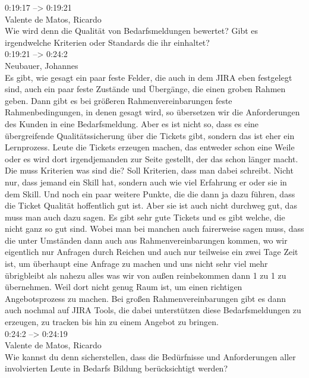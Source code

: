 0:19:17 --> 0:19:21\\
Valente de Matos, Ricardo\\
Wie wird denn die Qualität von Bedarfsmeldungen bewertet? Gibt es irgendwelche Kriterien oder Standards die ihr einhaltet?\\

0:19:21 --> 0:24:2\\
Neubauer, Johannes\\
Es gibt, wie gesagt ein paar feste Felder, die auch in dem JIRA eben festgelegt sind, auch ein paar feste Zustände und Übergänge, die einen groben Rahmen geben. Dann gibt es bei größeren Rahmenvereinbarungen feste Rahmenbedingungen, in denen gesagt wird, so übersetzen wir die Anforderungen des Kunden in eine Bedarfsmeldung. Aber es ist nicht so, dass es eine übergreifende Qualitätssicherung über die Tickets gibt, sondern das ist eher ein Lernprozess. Leute die Tickets erzeugen machen, das entweder schon eine Weile oder es wird dort irgendjemanden zur Seite gestellt, der das schon länger macht. Die muss Kriterien was sind die? Soll Kriterien, dass man dabei schreibt. Nicht nur, dass jemand ein Skill hat, sondern auch wie viel Erfahrung er oder sie in dem Skill. Und noch ein paar weitere Punkte, die die dann ja dazu führen, dass die Ticket Qualität hoffentlich gut ist. Aber sie ist auch nicht durchweg gut, das muss man auch dazu sagen. Es gibt sehr gute Tickets und es gibt welche, die nicht ganz so gut sind. Wobei man bei manchen auch fairerweise sagen muss, dass die unter Umständen dann auch aus Rahmenvereinbarungen kommen, wo wir eigentlich nur Anfragen durch Reichen und auch nur teilweise ein zwei Tage Zeit ist, um überhaupt eine Anfrage zu machen und uns nicht sehr viel mehr übrigbleibt als nahezu alles was wir von außen reinbekommen dann 1 zu 1 zu übernehmen. Weil dort nicht genug Raum ist, um einen richtigen Angebotsprozess zu machen. Bei großen Rahmenvereinbarungen gibt es dann auch nochmal auf JIRA Tools, die dabei unterstützen diese Bedarfsmeldungen zu erzeugen, zu tracken bis hin zu einem Angebot zu bringen.\\

0:24:2 --> 0:24:19\\
Valente de Matos, Ricardo\\
Wie kannst du denn sicherstellen, dass die Bedürfnisse und Anforderungen aller involvierten Leute in Bedarfs Bildung berücksichtigt werden?\\

